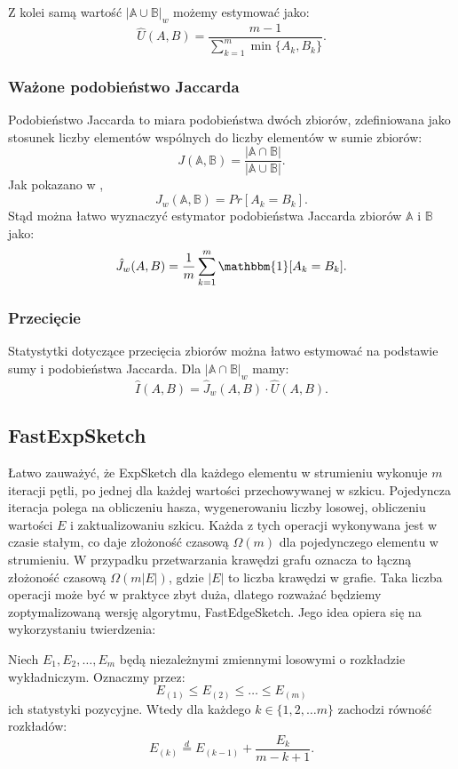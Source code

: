     Z kolei samą wartość $|\mathbb{A} \cup \mathbb{B}|_{w}$ możemy estymować jako:
    \[
        \hat{U}(A, B) = \frac{m - 1}{\sum\limits_{k = 1}^{m} \min{\{A_k, B_k\}}} .
    \]

    \subsubsection*{Ważone podobieństwo Jaccarda} 
    Podobieństwo Jaccarda to miara podobieństwa dwóch zbiorów, zdefiniowana jako stosunek liczby elementów wspólnych do liczby elementów w sumie zbiorów:
    \[
        J(\mathbb{A}, \mathbb{B}) = \frac{|\mathbb{A} \cap \mathbb{B}|}{|\mathbb{A} \cup \mathbb{B}|}.
    \]
    Jak pokazano w \cite{Lemiesz_2021}, 
    \[
        J_w(\mathbb{A}, \mathbb{B}) = Pr[A_k = B_k]. 
    \]
    Stąd można łatwo wyznaczyć estymator podobieństwa Jaccarda zbiorów $\mathbb{A}$ i $\mathbb{B}$ jako:
    \[
        \hat{J}_w(A, B) = \frac{1}{m} \sum\limits_{k = 1}^{m} \mathbbm{1}[A_k = B_k].  
    \]

    \subsubsection*{Przecięcie}
    Statystytki dotyczące przecięcia zbiorów można łatwo estymować na podstawie sumy i podobieństwa Jaccarda. Dla $|\mathbb{A} \cap \mathbb{B}|_{w}$ mamy:
    \[
        \hat{I}(A, B) = \hat{J}_w(A, B) \cdot \hat{U}(A, B).  
    \]

\subsection{FastExpSketch}
    Łatwo zauważyć, że ExpSketch dla każdego elementu w strumieniu wykonuje $m$ iteracji pętli, po jednej dla każdej wartości przechowywanej w szkicu. Pojedyncza iteracja polega na obliczeniu hasza, wygenerowaniu liczby losowej, obliczeniu wartości $E$ i zaktualizowaniu szkicu. Każda z tych operacji wykonywana jest w czasie stałym, co daje złożoność czasową $\Omega(m)$ dla pojedynczego elementu w strumieniu. W przypadku przetwarzania krawędzi grafu oznacza to łączną złożoność czasową $\Omega(m|E|)$, gdzie $|E|$ to liczba krawędzi w grafie. Taka liczba operacji może być w praktyce zbyt duża, dlatego rozważać będziemy zoptymalizowaną wersję algorytmu, FastEdgeSketch\cite{Lemiesz_2023}. Jego idea opiera się na wykorzystaniu twierdzenia\cite{Devroye_1986a}:
    \begin{twierdzenie}
        \label{theo:orderStatsExp}        
        Niech $E_1, E_2, \dots, E_m$ będą niezależnymi zmiennymi losowymi o rozkładzie wykładniczym. Oznaczmy przez:
        \[
            E_{(1)} \leq E_{(2)} \leq \dots \leq E_{(m)}  
        \]
        ich statystyki pozycyjne. Wtedy dla każdego $k \in \{1,2, \dots m\}$ zachodzi równość rozkładów:
        \[
            E_{(k)} \stackrel{d}{=} E_{(k - 1)} + \frac{E_k}{m - k + 1}.       
        \]
    \end{twierdzenie}

